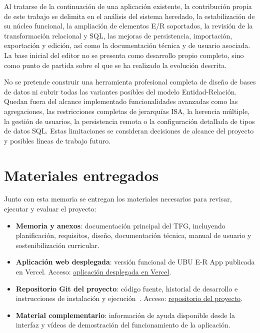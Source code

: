Al tratarse de la continuación de una aplicación existente, la contribución propia de este trabajo se delimita en el análisis del sistema heredado, la estabilización de su núcleo funcional, la ampliación de elementos E/R soportados, la revisión de la transformación relacional y SQL, las mejoras de persistencia, importación, exportación y edición, así como la documentación técnica y de usuario asociada. La base inicial del editor no se presenta como desarrollo propio completo, sino como punto de partida sobre el que se ha realizado la evolución descrita.

No se pretende construir una herramienta profesional completa de diseño de bases de datos ni cubrir todas las variantes posibles del modelo Entidad-Relación. Quedan fuera del alcance implementado funcionalidades avanzadas como las agregaciones, las restricciones completas de jerarquías ISA, la herencia múltiple, la gestión de usuarios, la persistencia remota o la configuración detallada de tipos de datos SQL. Estas limitaciones se consideran decisiones de alcance del proyecto y posibles líneas de trabajo futuro.

\section{Materiales entregados}

Junto con esta memoria se entregan los materiales necesarios para revisar, ejecutar y evaluar el proyecto:

\begin{itemize}
\item \textbf{Memoria y anexos}: documentación principal del TFG, incluyendo planificación, requisitos, diseño, documentación técnica, manual de usuario y sostenibilización curricular.

\item \textbf{Aplicación web desplegada}: versión funcional de UBU E-R App publicada en Vercel. Acceso: \href{https://draw-entity-relation-opal.vercel.app/}{aplicación desplegada en Vercel}.

\item \textbf{Repositorio Git del proyecto}: código fuente, historial de desarrollo e instrucciones de instalación y ejecución~\cite{alba2026ubuERRepo}. Acceso: \href{https://github.com/saa1002/draw-entity-relation}{repositorio del proyecto}.

\item \textbf{Material complementario}: información de ayuda disponible desde la interfaz y vídeos de demostración del funcionamiento de la aplicación.
\end{itemize}

